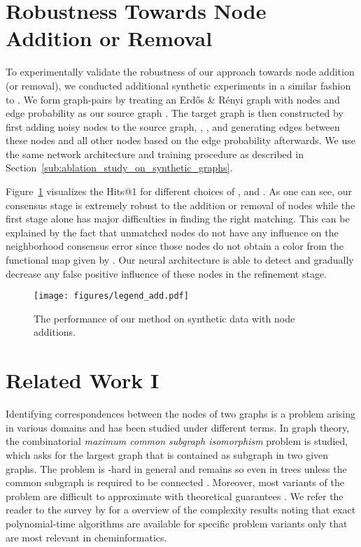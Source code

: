 \documentclass{article}
\begin{document}
\section{Robustness Towards Node Addition or Removal}\label{sec:robustness_towards_node_addition_or_removal}

To experimentally validate the robustness of our approach towards node addition (or removal), we conducted additional synthetic experiments in a similar fashion to \citet{Xu/etal/2019c}.
We form graph-pairs by treating an Erd\H{o}s \& R\'{e}nyi graph with  nodes and edge probability  as our source graph .
The target graph  is then constructed by first adding  noisy nodes to the source graph, \ie, , and generating edges between these nodes and all other nodes based on the edge probability  afterwards.
We use the same network architecture and training procedure as described in Section~\ref{sub:ablation_study_on_synthetic_graphs}.

Figure~\ref{fig:syn_add} visualizes the Hits@1 for different choices of ,  and .
As one can see, our consensus stage is extremely robust to the addition or removal of nodes while the first stage alone has major difficulties in finding the right matching.
This can be explained by the fact that unmatched nodes do not have any influence on the neighborhood consensus error since those nodes do not obtain a color from the functional map given by .
Our neural architecture is able to detect and gradually decrease any false positive influence of these nodes in the refinement stage.

\begin{figure}[t]
  \centering
  \texttt{[image: figures/legend\_add.pdf]}\\
  \hspace{1cm}
  \caption{The performance of our method on synthetic data with node additions.}\label{fig:syn_add}
\end{figure}

\section{Related Work I}\label{sec:related_work_i}

Identifying correspondences between the nodes of two graphs is a problem arising in various domains and has been studied under different terms.
In graph theory, the combinatorial \emph{maximum common subgraph isomorphism} problem is studied, which asks for the largest graph that is contained as subgraph in two given graphs.
The problem is -hard in general and remains so even in trees \citep{Garey/Johnson/1979} unless the common subgraph is required to be connected \citep{Matula/1978}.
Moreover, most variants of the problem are difficult to approximate with theoretical guarantees \citep{Kann/1992}.
We refer the reader to the survey by \citet{Kriege/etal/2019} for a overview of the complexity results noting that exact polynomial-time algorithms are available for specific problem variants only that are most relevant in cheminformatics.
\end{document}
